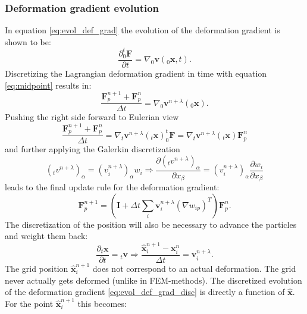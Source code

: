 \documentclass[m,times]{cgMA}
\begin{document}
\subsubsection{Deformation gradient evolution}
In equation \ref{eq:evol_def_grad} the evolution of the deformation gradient is shown to be:
\begin{equation}
  \frac{\partial ^t_0\boldsymbol{F}}{\partial t} =  \nabla{_0\boldsymbol{v}}(_0\boldsymbol{x},t).
\end{equation}
Discretizing the Lagrangian deformation gradient in time with equation \ref{eq:midpoint} results in:
\begin{equation}
  \frac{\boldsymbol{F}^{n+1}_p + \boldsymbol{F}^{n}_p}{\Delta t} =  \nabla_0\boldsymbol{v}^{n+\lambda}(_0\boldsymbol{x}).
\end{equation}
Pushing the right side forward to Eulerian view
\begin{equation}
  \frac{\boldsymbol{F}^{n+1}_p + \boldsymbol{F}^{n}_p}{\Delta t} =  \nabla_t\boldsymbol{v}^{n+\lambda}(_t\boldsymbol{x})^t_0\boldsymbol{F} = \nabla_t\boldsymbol{v}^{n+\lambda}(_t\boldsymbol{x})\boldsymbol{F}^n_p
\end{equation}
and further applying the Galerkin discretization
\begin{equation}
  (_tv^{n+\lambda})_\alpha = (v_{i}^{n+\lambda})_\alpha w_i \Rightarrow \frac{\partial (_tv^{n+\lambda})_\alpha}{\partial x_\beta} =(v_i^{n+\lambda})_\alpha\frac{\partial w_i}{\partial x_\beta}
\end{equation}
leads to the final update rule for the deformation gradient:
\begin{equation}\label{eq:evol_def_grad_disc}
\boldsymbol{F}^{n+1}_p = \left( \boldsymbol{I} + \Delta t\sum_i \boldsymbol{v}_i^{n+\lambda}({\nabla w_{ip}})^T \right)\boldsymbol{F}^{n}_p.
\end{equation}
The discretization of the position will also be necessary to advance the particles and weight them back:
\begin{equation}  \frac{\partial _t\boldsymbol{x}}{\partial t} = {_t\boldsymbol{v}} \Rightarrow \frac{\boldsymbol{\hat{x}}_i^{n+1}
  - \boldsymbol{x}_i^{n}}{\Delta t} = \boldsymbol{v}_i^{n+\lambda}.
\end{equation}
The grid position $\boldsymbol{\hat{x}}_i^{n+1}$ does not correspond to an actual deformation. The grid never actually gets deformed (unlike in FEM-methods). The discretized evolution of the deformation gradient  \ref{eq:evol_def_grad_disc} is directly a function of $\boldsymbol{\hat{x}}$. For the point $\boldsymbol{\hat{x}}_i^{n+1}$ this becomes:
\end{document}
